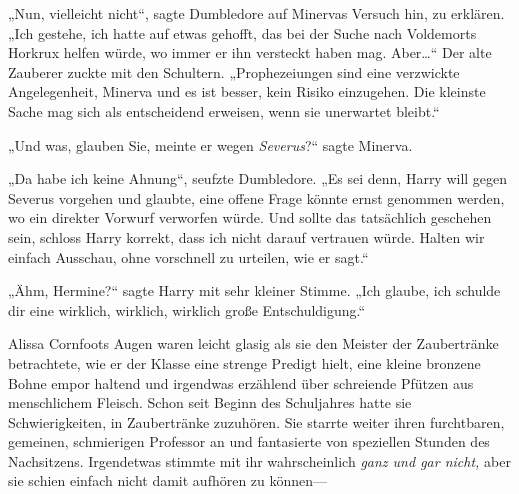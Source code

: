 „Nun, vielleicht nicht“, sagte Dumbledore auf Minervas Versuch hin, zu erklären. „Ich gestehe, ich hatte auf etwas gehofft, das bei der Suche nach Voldemorts Horkrux helfen würde, wo immer er ihn versteckt haben mag. Aber…“ Der alte Zauberer zuckte mit den Schultern. „Prophezeiungen sind eine verzwickte Angelegenheit, Minerva und es ist besser, kein Risiko einzugehen. Die kleinste Sache mag sich als entscheidend erweisen, wenn sie unerwartet bleibt.“

„Und was, glauben Sie, meinte er wegen \emph{Severus}?“ sagte Minerva.

„Da habe ich keine Ahnung“, seufzte Dumbledore. „Es sei denn, Harry will gegen Severus vorgehen und glaubte, eine offene Frage könnte ernst genommen werden, wo ein direkter Vorwurf verworfen würde. Und sollte das tatsächlich geschehen sein, schloss Harry korrekt, dass ich nicht darauf vertrauen würde. Halten wir einfach Ausschau, ohne vorschnell zu urteilen, wie er sagt.“


„Ähm, Hermine?“ sagte Harry mit sehr kleiner Stimme. „Ich glaube, ich schulde dir eine wirklich, wirklich, wirklich große Entschuldigung.“


Alissa Cornfoots Augen waren leicht glasig als sie den Meister der Zaubertränke betrachtete, wie er der Klasse eine strenge Predigt hielt, eine kleine bronzene Bohne empor haltend und irgendwas erzählend über schreiende Pfützen aus menschlichem Fleisch. Schon seit Beginn des Schuljahres hatte sie Schwierigkeiten, in Zaubertränke zuzuhören. Sie starrte weiter ihren furchtbaren, gemeinen, schmierigen Professor an und fantasierte von speziellen Stunden des Nachsitzens. Irgendetwas stimmte mit ihr wahrscheinlich \emph{ganz und gar nicht,} aber sie schien einfach nicht damit aufhören zu können—

